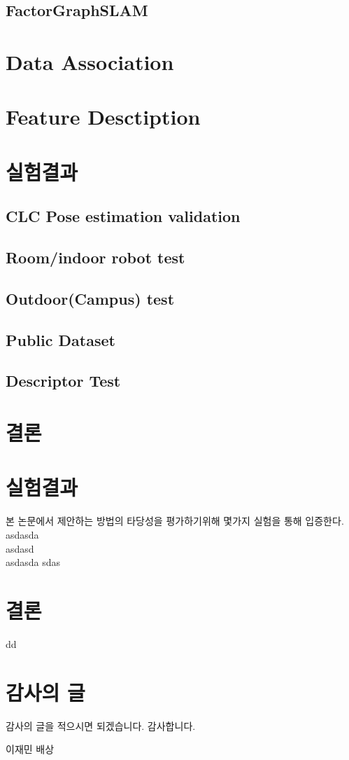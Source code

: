 \documentclass[master,korean,final]{cbnu-ecs}
\begin{document}
\section{FactorGraphSLAM}
\subsection{}
\chapter{Data Association}
\chapter{Feature Desctiption}
\chapter{실험결과}
\section{CLC Pose estimation validation}
\section{Room/indoor robot test}
\section{Outdoor(Campus) test}
\section{Public Dataset}
\section{Descriptor Test}
\chapter{결론}


\chapter{실험결과}

본 논문에서 제안하는 방법의 타당성을 평가하기위해 몇가지 실험을 통해 입증한다. \\
asdasda\\
asdasd\\
asdasda
sdas

\chapter{결론}

dd

\begin{thebibliography}{1}

\end{thebibliography}

\chapter*{감사의 글}

감사의 글을 적으시면 되겠습니다.
감사합니다.

\begin{flushright}
\vspace{1cm}
이재민 배상
\end{flushright}
\end{document}
